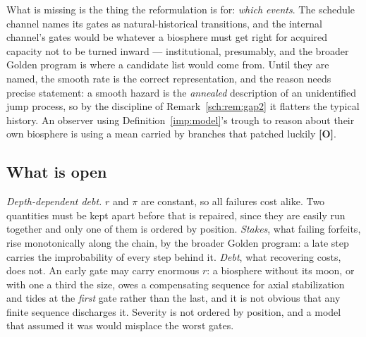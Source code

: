 What is missing is the thing the reformulation is for: \emph{which
events}. The schedule channel names its gates as natural-historical
transitions, and the internal channel's gates would be whatever a
biosphere must get right for acquired capacity not to be turned inward
--- institutional, presumably, and the broader Golden program is where a
candidate list would come from. Until they are named, the smooth rate is the correct representation, and the reason needs precise statement: a
smooth hazard is the \emph{annealed} description of an unidentified jump
process, so by the discipline of Remark~\ref{sch:rem:gap2} it flatters
the typical history. An observer using Definition~\ref{imp:model}'s trough to
reason about their own biosphere is using a mean carried by branches that
patched luckily \textbf{[O]}.

\subsection{What is open}\label{sch:subsub:open}

\emph{Depth-dependent debt.} $r$ and $\pi$ are constant, so all failures
cost alike. Two quantities must be kept apart before that is repaired,
since they are easily run together and only one of them is ordered by
position. \emph{Stakes}, what failing forfeits, rise monotonically
along the chain, by the broader Golden program: a late step carries
the improbability of every step behind it. \emph{Debt}, what
recovering costs, does not. An early gate may carry enormous $r$: a
biosphere without its moon, or with one a third the size, owes a
compensating sequence for axial stabilization and tides at the
\emph{first} gate rather than the last, and it is not obvious that any
finite sequence discharges it. Severity is not ordered by position, and
a model that assumed it was would misplace the worst gates.

